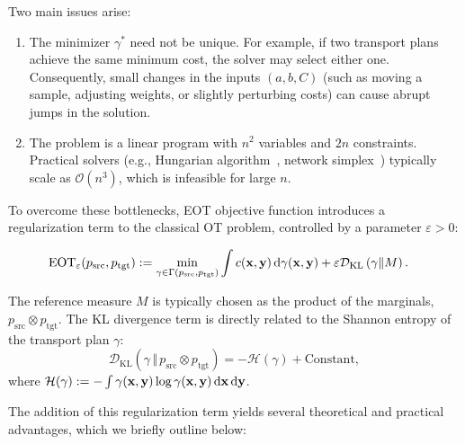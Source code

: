 Two main issues arise:
\begin{enumerate}
    \item {} The minimizer $\gamma^*$ need not be unique. 
    For example, if two transport plans achieve the same minimum cost, the solver may select either one. 
    Consequently, small changes in the inputs $(a,b,C)$ (such as moving a sample, adjusting weights, or slightly perturbing costs) can cause abrupt jumps in the solution.  
    \item {} The problem is a linear program with $n^2$ variables and $2n$ constraints. 
    Practical solvers (e.g., Hungarian algorithm~\citep{kuhn1955hungarian,munkres1957algorithms}, network simplex~\citep{peyre2019computational}) typically scale as $\mathcal{O}(n^3)$, which is infeasible for large $n$.
\end{enumerate}

To overcome these bottlenecks,  EOT objective function introduces a regularization term to the classical OT problem, controlled by a parameter $\varepsilon > 0$:
\begin{mdframed}
    \begin{align}\label{eq:eot-epsilon}
\begin{aligned}
        \text{EOT}_\varepsilon(p_{\mathrm{src}}, p_{\mathrm{tgt}}) &:= \min_{\gamma \in \Gamma(p_{\mathrm{src}}, p_{\mathrm{tgt}})} \int c({\mathbf{x}},  {\mathbf{y}})  \mathop{}\!\mathrm{d}\gamma({\mathbf{x}}, {\mathbf{y}}) 
        + \varepsilon \mathcal{D}_{\text{KL}}\left(\gamma \Vert M \right).
\end{aligned}
\end{align}
\end{mdframed}
The reference measure $M$ is typically chosen as the product of the marginals, $p_{\mathrm{src}} \otimes p_{\mathrm{tgt}}$. The KL divergence term is directly related to the Shannon entropy of the transport plan $\gamma$:
\[
\mathcal{D}_{\text{KL}}(\gamma \,\Vert\, p_{\mathrm{src}} \otimes p_{\mathrm{tgt}}) = -\mathcal{H}(\gamma) + \text{Constant},
\]
where $\mathcal{H}(\gamma) := -\int \gamma({\mathbf{x}}, {\mathbf{y}}) \log \gamma({\mathbf{x}}, {\mathbf{y}}) \mathop{}\!\mathrm{d} {\mathbf{x}} \mathop{}\!\mathrm{d} {\mathbf{y}}$.



The addition of this regularization term yields several theoretical and practical advantages, which we briefly outline below:
